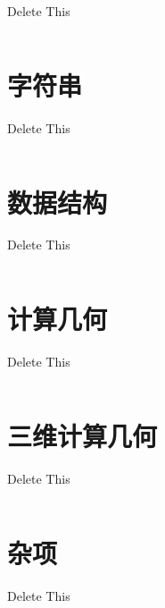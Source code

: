 \documentclass[twoside]{article}
\begin{document}
Delete This
\begin{lstlisting}
\end{lstlisting}
\clearpage\section{字符串}
Delete This
\begin{lstlisting}
\end{lstlisting}
\clearpage\section{数据结构}
Delete This
\begin{lstlisting}
\end{lstlisting}
\clearpage\section{计算几何}
Delete This
\begin{lstlisting}
\end{lstlisting}
\clearpage\section{三维计算几何}
Delete This
\begin{lstlisting}
\end{lstlisting}
\clearpage\section{杂项}
Delete This
\begin{lstlisting}
\end{lstlisting}
\end{document}
